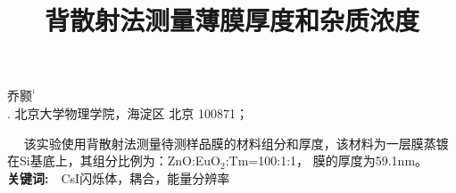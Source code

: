 \documentclass[a4paper,10.0pt,twoside]{npr}
\begin{document}
\setcounter{page}{001}%
\begin{center}
\title{%
\xiaoerhao \bf  %
背散射法测量薄膜厚度和杂质浓度\\[-5mm]}
\maketitle
\large \fs
乔颢$^{^1}$\\[2mm]

\xiaowu {}. 北京大学物理学院，海淀区 北京 100871；\\[4mm]

 

\parbox{158mm} {
~~\fs
该实验使用背散射法测量待测样品膜的材料组分和厚度，该材料为一层膜蒸镀在Si基底上，其组分比例为：ZnO:EuO$_2$:Tm=100:1:1， 膜的厚度为59.1nm。
\\
{\bf 关键词:}~~\fs CsI闪烁体，耦合，能量分辨率}\\
\end{center}
\vspace{5mm}
\setcounter{section}{0}
\end{document}
